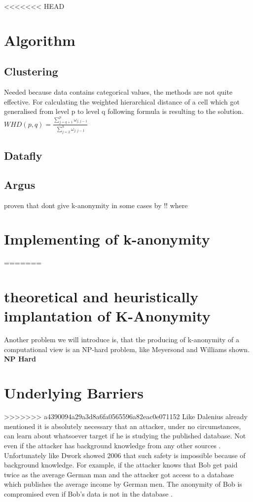 \documentclass{llncs}
\begin{document}
<<<<<<< HEAD

\section{Algorithm}
\subsection{Clustering}
Needed because data contains categorical values, the methods are not quite effective.
\cite{li2006achieving}
For calculating the weighted hierarchical distance of a cell which got generalised from level p to level q following formula is resulting to the solution.\\
$ WHD (p, q) = \frac{\sum_{j=q+1}^{p} \omega_{j,j-1}}{\sum_{j=2}^{h} \omega_{j,j-1}} $
\subsection{Datafly}

\subsection{Argus}
proven that dont give k-anonymity in some cases by \cite{sweeney2002achieving}!! where


\newpage


\section{Implementing of k-anonymity}

=======
\section{theoretical and heuristically implantation of K-Anonymity}
Another problem we will introduce is, that the producing of k-anonymity of a computational view is an NP-hard problem, like Meyersond and Williams shown.
\textbf{NP Hard}  
\section{Underlying Barriers}
>>>>>>> a4390094a29a3d8a6fa0565596a82eac0e071152
Like Dalenius already mentioned it is absolutely necessary that an attacker, under no circumstances, can learn about whatsoever target if he is studying the published database. Not even if the attacker has background knowledge from any other sources  \cite{Dalenius1977}. Unfortunately like Dwork showed 2006 that such safety is impossible because of background knowledge. For example, if the attacker knows that Bob get paid twice as the average German man and the attacker got access to a database which publishes the average income by German men. The anonymity of Bob is compromised even if Bob's data is not in the database \cite{dwork2011differential}.  
\end{document}

